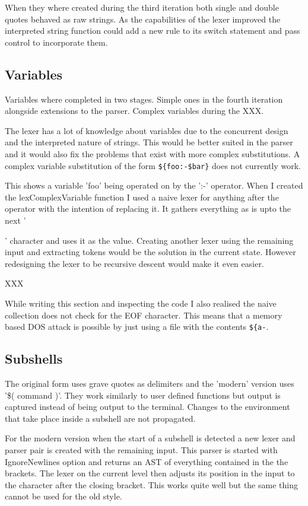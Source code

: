 {When they where created during the third iteration both single and double quotes behaved as raw strings.
As the capabilities of the lexer improved the interpreted string function could add a new rule to its switch statement and
pass control to incorporate them.

\subsection{Variables}
Variables where completed in two stages.
Simple ones in the fourth iteration alongside extensions to the parser.
Complex variables during the XXX.

The lexer has a lot of knowledge about variables due to the concurrent design and the interpreted nature of strings.
This would be better suited in the parser and it would also fix the problems that exist with more complex substitutions.
A complex variable substitution of the form \verb!${foo:-$bar}! does not currently work.

This shows a variable 'foo' being operated on by the ':-' operator.
When I created the lexComplexVariable function I used a naive lexer for anything after the operator with the intention of replacing it.
It gathers everything as is upto the next '}' character and uses it as the value.
Creating another lexer using the remaining input and extracting tokens would be the solution in the current state.
However redesigning the lexer to be recursive descent would make it even easier.

XXX

While writing this section and inspecting the code I also realised the naive collection does not check for the EOF character.
This means that a memory based DOS attack is possible by just using a file with the contents \verb!${a-!.

\subsection{Subshells}
The original form uses grave quotes as delimiters and the 'modern' version uses '\$( command )'.
They work similarly to user defined functions but output is captured instead of being output to the terminal.
Changes to the environment that take place inside a subshell are not propagated. 

For the modern version when the start of a subshell is detected a new lexer and parser pair is created with the remaining input.
This parser is started with IgnoreNewlines option and returns an AST of everything contained in the the brackets.
The lexer on the current level then adjusts its position in the input to the character after the closing bracket.
This works quite well but the same thing cannot be used for the old style.

